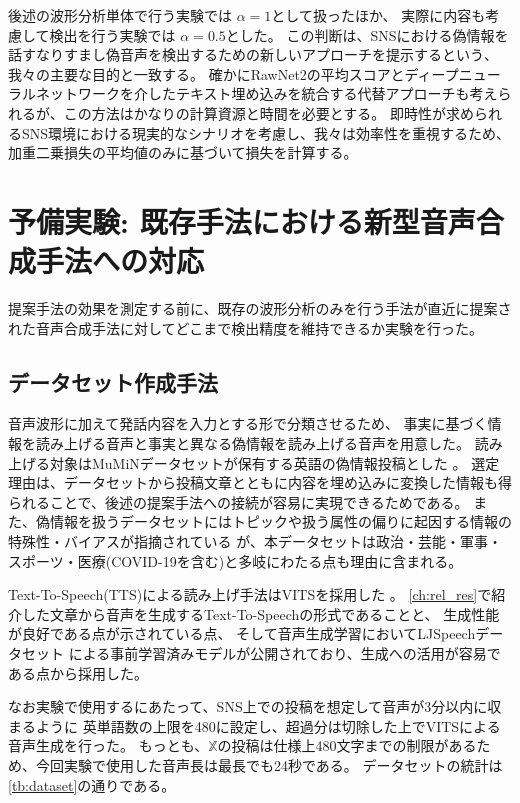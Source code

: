 後述の波形分析単体で行う実験では $\alpha = 1$として扱ったほか、
実際に内容も考慮して検出を行う実験では $\alpha = 0.5$とした。
この判断は、SNSにおける偽情報を話すなりすまし偽音声を検出するための新しいアプローチを提示するという、我々の主要な目的と一致する。
確かにRawNet2の平均スコアとディープニューラルネットワークを介したテキスト埋め込みを統合する代替アプローチも考えられるが、この方法はかなりの計算資源と時間を必要とする。
即時性が求められるSNS環境における現実的なシナリオを考慮し、我々は効率性を重視するため、加重二乗損失の平均値のみに基づいて損失を計算する。

\section{予備実験: 既存手法における新型音声合成手法への対応}
提案手法の効果を測定する前に、既存の波形分析のみを行う手法が直近に提案された音声合成手法に対してどこまで検出精度を維持できるか実験を行った。

\subsection{データセット作成手法}\label{ssc:spc_ds}
音声波形に加えて発話内容を入力とする形で分類させるため、
事実に基づく情報を読み上げる音声と事実と異なる偽情報を読み上げる音声を用意した。
読み上げる対象はMuMiNデータセットが保有する英語の偽情報投稿とした \cite{10.1145/3477495.3531744}。
選定理由は、データセットから投稿文章とともに内容を埋め込みに変換した情報も得られることで、後述の提案手法への接続が容易に実現できるためである。
また、偽情報を扱うデータセットにはトピックや扱う属性の偏りに起因する情報の特殊性・バイアスが指摘されている \cite{10.1145/3477495.3531816}が、本データセットは政治・芸能・軍事・スポーツ・医療(COVID-19を含む)と多岐にわたる点も理由に含まれる。

Text-To-Speech(TTS)による読み上げ手法はVITSを採用した \cite{pmlr-v139-kim21f}。
\cref{ch:rel_res}で紹介した文章から音声を生成するText-To-Speechの形式であることと、
生成性能が良好である点が示されている点、
そして音声生成学習においてLJSpeechデータセット \cite{ljspeech17}による事前学習済みモデルが公開されており、生成への活用が容易である点から採用した。

なお実験で使用するにあたって、SNS上での投稿を想定して音声が3分以内に収まるように
英単語数の上限を480に設定し、超過分は切除した上でVITSによる音声生成を行った。
もっとも、$\mathbb{X}$の投稿は仕様上480文字までの制限があるため、今回実験で使用した音声長は最長でも24秒である。
データセットの統計は\cref{tb:dataset}の通りである。

